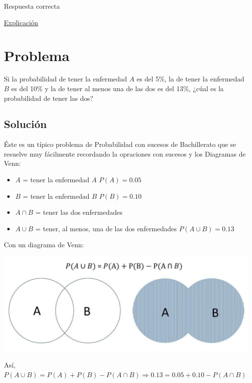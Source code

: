\documentclass[
]{book}
\providecommand{\tightlist}{%
  \setlength{\itemsep}{0pt}\setlength{\parskip}{0pt}}
\begin{document}
Respuesta correcta

\href{https://1fjmanzano.github.io/bioestadistica/relaci\%C3\%B3n-entre-variables-cualitativas.html\#diagno\%CC\%81stico-cli\%CC\%81nico}{Explicación}

\hypertarget{problema-18}{%
\section{Problema}\label{problema-18}}

Si la probabilidad de tener la enfermedad \(A\) es del 5\%, la de tener la enfermedad \(B\) es del 10\% y la de tener al menos una de las dos es del 13\%, ¿cúal es la probabilidad de tener las dos?

\hypertarget{soluciuxf3n-14}{%
\subsection{Solución}\label{soluciuxf3n-14}}

Éste es un típico problema de Probabilidad con sucesos de Bachillerato que se resuelve muy fácilmente recordando la opraciones con sucesos y los Diagramas de Venn:

\begin{itemize}
\tightlist
\item
  \(A\) = tener la enfermedad \(A\) \(P(A)=0.05\)
\item
  \(B\) = tener la enfermedad \(B\) \(P(B)=0.10\)
\item
  \(A \cap B\) = tener las dos enfermedades
\item
  \(A \cup B\) = tener, al menos, una de las dos enfermedades \(P(A \cup B) = 0.13\)
\end{itemize}

Con un diagrama de Venn:

\includegraphics[width=16.03in]{img/7_1}

Así, \(P(A \cup B)=P(A)+P(B)-P(A \cap B) \Rightarrow 0.13=0.05 + 0.10 - P(A \cap B)\)
\end{document}
